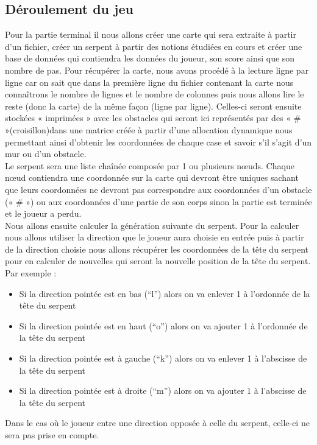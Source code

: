 \documentclass{article}
\begin{document}
\subsection{Déroulement du jeu}
Pour la partie terminal il nous allons créer une carte qui sera extraite à partir d'un fichier, créer un serpent à partir des notions étudiées en cours et créer une base de données qui contiendra les données du joueur, son score ainsi que son nombre de pas.
Pour récupérer la carte, nous avons procédé à la lecture ligne par ligne car on sait que dans la première ligne du fichier contenant la carte nous connaîtrons le nombre de lignes et le nombre de colonnes puis nous allons lire le reste (donc la carte) de la même façon (ligne par ligne). Celles-ci seront ensuite stockées « imprimées » avec les obstacles qui seront ici représentés par des « \# »(croisillon)dans une matrice créée à partir d'une allocation dynamique nous permettant ainsi d'obtenir les coordonnées de chaque case et savoir s'il s'agit d'un mur ou d'un obstacle.\\[0.5 cm]
Le serpent sera une liste chaînée composée par 1 ou plusieurs nœuds. Chaque nœud contiendra une coordonnée sur la carte qui devront être uniques sachant que leurs coordonnées ne devront pas correspondre aux coordonnées d'un obstacle (« \# ») ou aux coordonnées d'une partie de son corps sinon la partie est terminée et le joueur a perdu.\\[0.5 cm]
Nous allons ensuite calculer la génération suivante du serpent. Pour la calculer nous allons utiliser la direction que le joueur aura choisie en entrée puis à partir de la direction choisie nous allons récupérer les coordonnées de la tête du serpent pour en calculer de nouvelles qui seront la nouvelle position de la tête du serpent. Par exemple : 
\begin{itemize}
    \item Si la direction pointée est en bas (“l”) alors on va enlever 1 à l’ordonnée de la tête du serpent
    \item Si la direction pointée est en haut (“o”) alors on va ajouter 1 à l’ordonnée de la tête du serpent
    \item Si la direction pointée est à gauche (“k”) alors on va enlever 1 à l’abscisse de la tête du serpent
    \item Si la direction pointée est à droite (“m”) alors on va ajouter 1 à l’abscisse de la tête du serpent

\end{itemize}
Dans le cas où le joueur entre une direction opposée à celle du serpent, celle-ci ne sera pas prise en compte.\\[0.5cm]
\end{document}
